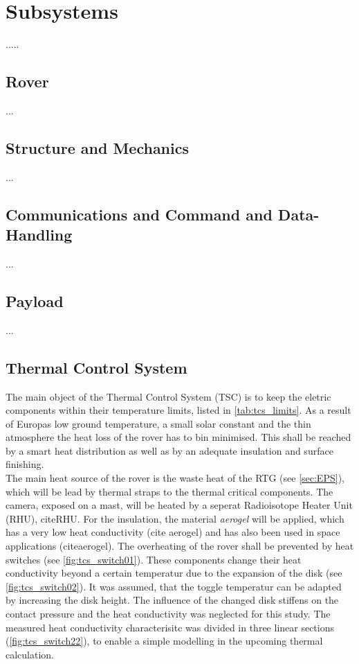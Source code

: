 \chapter{Subsystems}
\label{chap:subsystems}
.....



\section{Rover}
\label{sec:rover}
...
\section{Structure and Mechanics}
\label{sec:mechanics}
...
\section{Communications and Command and Data-Handling}
\label{sec:comm}
...
\section{Payload}
\label{sec:payload}
...
\clearpage
\section{Thermal Control System} \label{sec:thermalcontrol}
The main object of the Thermal Control System (TSC) is to keep the eletric components within their temperature limits, listed in \autoref{tab:tcs_limits}.
As a result of Europas low ground temperature, a small solar constant and the thin atmosphere the heat loss of the rover has to bin minimised.
This shall be reached by a smart heat distribution as well as by an adequate insulation and surface finishing.
\\
The main heat source of the rover is the waste heat of the RTG (see \autoref{sec:EPS}), which will be lead by thermal straps to the thermal critical components.
The camera, exposed on a mast, will be heated by a seperat Radioisotope Heater Unit (RHU), cite{RHU}. %
For the insulation, the material \textit{aerogel} will be applied, which has a very low heat conductivity (cite aerogel) and has also been used in space applications (cite{aerogel}).
The overheating of the rover shall be prevented by heat switches (see \autoref{fig:tcs_switch01}).
These components change their heat conductivity beyond a certain temperatur due to the expansion of the disk (see \autoref{fig:tcs_switch02}).
It was assumed, that the toggle temperatur can be adapted by increasing the disk height.
The influence of the changed disk stiffens on the contact pressure and the heat conductivity was neglected for this study.
The measured heat conductivity characterisitc was divided in three linear sections (\autoref{fig:tcs_switch22}), to enable a simple modelling in the upcoming thermal calculation.


